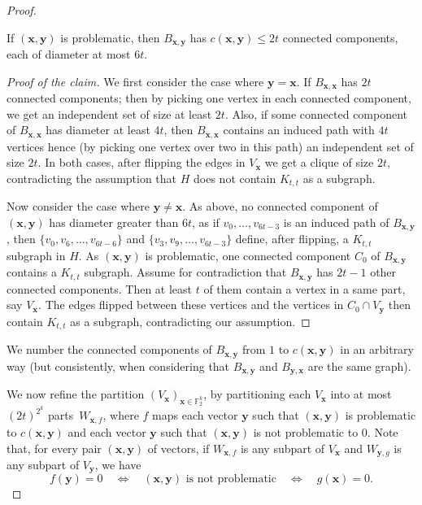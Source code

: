 \documentclass[10pt,a4paper]{amsart}
\newenvironment{claimproof}{\begin{proof}[Proof of the claim]
	\renewcommand\qedsymbol{$\vartriangleleft$}
}{\end{proof}}
\begin{document}
\begin{proof}
	\begin{claim}
		\label{claim:cc}
		If $(\mathbf x,\mathbf y)$ is problematic, then 
		$B_{\mathbf x,\mathbf y}$ has $c(\mathbf x,\mathbf y)\leq 2t$ connected components, each of diameter at most $6t$.
	\end{claim}
	\begin{claimproof}
		We first consider the case where $\mathbf y=\mathbf x$.
		If $B_{\mathbf x,\mathbf x}$ has $2t$ connected components; then by picking one vertex in each connected component, we get an independent set of size at least $2t$.
		Also, if some connected component of $B_{\mathbf x,\mathbf x}$ has diameter at least $4t$, then $B_{\mathbf x,\mathbf x}$ contains an induced path with $4t$ vertices hence (by picking one vertex over two in this path) an independent set of size $2t$. In both cases, after flipping the edges in $V_{\mathbf x}$ we get a clique of size $2t$, contradicting the assumption that $H$ does not contain $K_{t,t}$ as a subgraph. 
		
		Now consider the case where $\mathbf y\neq\mathbf x$.
		As above, no connected component of $(\mathbf x,\mathbf y)$ has diameter greater than $6t$, as if $v_0,\dots,v_{6t-3}$ is an induced path
		of $B_{\mathbf x,\mathbf y}$, then $\{v_0,v_6,\dots,v_{6t-6}\}$ and 
		$\{v_3,v_9,\dots,v_{6t-3}\}$ define, after flipping, a $K_{t,t}$ subgraph in $H$.	As $(\mathbf x,\mathbf y)$ is problematic, one connected  component $C_0$ of $B_{\mathbf x,\mathbf y}$ contains a $K_{t,t}$ subgraph. Assume for contradiction that $B_{\mathbf x,\mathbf y}$  has $2t-1$ other connected components. Then at least $t$ of them contain a vertex in a same part, say $V_{\mathbf x}$. The edges flipped between these vertices and the vertices in $C_0\cap V_{\mathbf y}$ then contain $K_{t,t}$ as a subgraph, contradicting our assumption.
		\end{claimproof}
	
	We number the connected components of $B_{\mathbf x,\mathbf y}$ from $1$ to $c(\mathbf x,\mathbf y)$ in an arbitrary way (but consistently, when  considering that $B_{\mathbf x,\mathbf y}$ and  $B_{\mathbf y,\mathbf x}$ are the same graph).
	
	We now refine the partition $(V_{\mathbf x})_{\mathbf x\in\mathbb F_2^k}$,
	by partitioning each $V_{\mathbf x}$ into at most $(2t)^{2^k}$ parts~$W_{\mathbf x,f}$, where $f$ maps each vector $\mathbf y$ such that $(\mathbf x,\mathbf y)$ is problematic to $c(\mathbf x,\mathbf y)$ and each vector $\mathbf y$ such that $(\mathbf x,\mathbf y)$ is not problematic to $0$.  
	Note that, for every pair  $(\mathbf x,\mathbf y)$ of vectors, if  
	$W_{\mathbf x,f}$ is any subpart of $V_{\mathbf x}$ and 
	$W_{\mathbf y,g}$ is any subpart of $V_{\mathbf y}$, we have
	\[
	f(\mathbf y)=0\quad\iff\quad(\mathbf x,\mathbf y)\text{ is not problematic}\quad\iff\quad g(\mathbf x)=0.\]
	

\end{proof}
\end{document}
